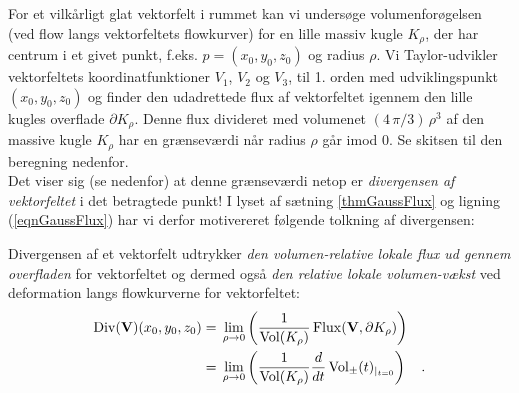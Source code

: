 For et vilkårligt glat vektorfelt i rummet kan vi
undersøge volumenforøgelsen (ved flow langs
vektorfeltets flowkurver) for en lille massiv
kugle $K_{\rho}$, der har centrum i et givet
punkt, f.eks. $p = (x_{0}, y_{0}, z_{0})$ og
radius $\rho$. Vi Taylor-udvikler vektorfeltets
koordinatfunktioner $V_{1}$, $V_{2}$ og $V_{3}$,
til 1. orden med udviklingspunkt $(x_{0}, y_{0},
z_{0})$ og finder den udadrettede flux af
vektorfeltet igennem den lille kug\-les overflade
$\partial K_{\rho}$. Denne flux divideret med
volumenet $(4\,\pi/3)\,\rho^{3}$ af den massive
kugle $K_{\rho}$ har en grænseværdi når radius
$\rho$ går imod $0$. Se skitsen til den beregning
nedenfor.\\

Det viser sig (se nedenfor) at denne grænseværdi
netop er \emph{divergensen af vektorfeltet} i det
betragtede punkt! I lyset af sætning
\ref{thmGaussFlux} og ligning
(\ref{eqnGaussFlux}) har vi derfor motivereret
følgende tolkning af divergensen:

\begin{theorem} \label{thmDivGeom}
Divergensen af et vektorfelt udtrykker {\em{den
{volumen-relative lokale flux} ud gennem
overfladen}} for vektorfeltet og dermed også
{\em{den relative lokale volumen-vækst}} ved
deformation langs flowkurverne for vektorfeltet:
\begin{equation}
\begin{aligned}
\operatorname{Div}({\bf{V}})(x_{0}, y_{0}, z_{0})
&= \, \lim_{\rho \to 0}\left(
\frac{1}{\operatorname{Vol}(K_{\rho})}\operatorname{Flux}({\bf{V}},
\partial K_{\rho})\right) \,\\
 &= \,
\lim_{\rho \to 0}\left( \frac{1}{\operatorname{Vol}(K_{\rho})}
\frac{d}{dt}\operatorname{Vol}_{\pm}(t)_{|_{t=0}}    \right)
 \quad .
\end{aligned}
\end{equation}
\end{theorem}

